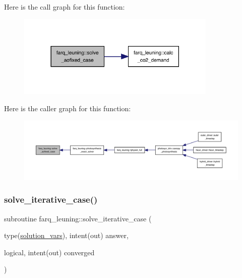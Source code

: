 Here is the call graph for this function\+:
\nopagebreak
\begin{figure}[H]
\begin{center}
\leavevmode
\includegraphics[width=270pt]{namespacefarq__leuning_a8dbd2dbff6eba13ef68535d94a06a569_cgraph}
\end{center}
\end{figure}
Here is the caller graph for this function\+:
\nopagebreak
\begin{figure}[H]
\begin{center}
\leavevmode
\includegraphics[width=350pt]{namespacefarq__leuning_a8dbd2dbff6eba13ef68535d94a06a569_icgraph}
\end{center}
\end{figure}
\mbox{\label{namespacefarq__leuning_a88f53f468e321e185e87a1fa9f890116}} 
\subsubsection{\texorpdfstring{solve\+\_\+iterative\+\_\+case()}{solve\_iterative\_case()}}
{\footnotesize\ttfamily subroutine farq\+\_\+leuning\+::solve\+\_\+iterative\+\_\+case (\begin{DoxyParamCaption}\item[{type(\hyperlink{structc34constants_1_1solution__vars}{solution\+\_\+vars}), intent(out)}]{answer,  }\item[{logical, intent(out)}]{converged }\end{DoxyParamCaption})}

